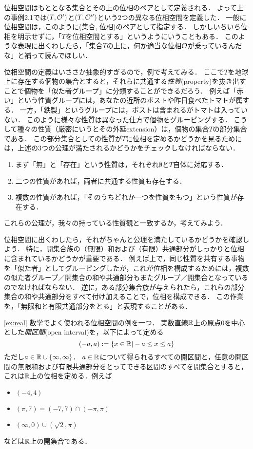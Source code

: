 \documentclass[11pt,a4paper]{jsarticle}
\begin{document}
位相空間はもととなる集合とその上の位相のペアとして定義される．
よって上の事例2.1では$(T, \mathcal{O}')$と$(T, \mathcal{O}'')$という2つの異なる位相空間を定義した．
一般に位相空間は，このように(集合, 位相)のペアとして指定する．
しかしいちいち位相を明示せずに，「$T$を位相空間とする」というようにいうこともある．
このような表現に出くわしたら，「集合$T$の上に，何か適当な位相$\mathcal{O}$が乗っているんだな」と補って読んでほしい．


\begin{example}
位相空間の定義はいささか抽象的すぎるので，例で考えてみる．
ここで$T$を地球上に存在する個物の集合とすると，それらに共通する\emph{性質}(property)を抜き出すことで個物を「似た者グループ」に分類することができるだろう．
例えば「赤い」という性質グループには，あなたの近所のポストや昨日食べたトマトが属する．
一方，「鉄製」というグループには，ポストは含まれるがトマトは入っていない．
このように様々な性質は異なった仕方で個物をグルーピングする．
こうして種々の性質（厳密にいうとその外延extension）は，個物の集合$T$の部分集合である．
この部分集合としての性質が$T$に位相を定めるかどうかを見るためには，上述の3つの公理が満たされるかどうかをチェックしなければならない．
\begin{enumerate}
 \item まず「無」と「存在」という性質は，それぞれ$\emptyset$と$T$自体に対応する．
 \item 二つの性質があれば，両者に共通する性質も存在する．
 \item 複数の性質があれば，「そのうちどれか一つを性質をもつ」という性質が存在する．
\end{enumerate}
これらの公理が，我々の持っている性質観と一致するか，考えてみよう．
\end{example}


位相空間に出くわしたら，それがちゃんと公理を満たしているかどうかを確認しよう．
特に，開集合族の（無限）和および（有限）共通部分がしっかりと位相に含まれているかどうかが重要である．
例えば上で，同じ性質を共有する事物を「似た者」としてグルーピングしたが，これが位相を構成するためには，複数の似た者グループ／開集合の和や共通部分もまたグループ／開集合となっているのでなければならない．
逆に，ある部分集合族が与えられたら，これらの部分集合の和や共通部分をすべて付け加えることで，位相を構成できる．
この作業を，「無限和と有限共通部分をとる」と表現することがある．


\begin{example}
\ref{ex:real}
数学でよく使われる位相空間の例を一つ．
実数直線$\mathbb{R}$上の原点0を中心とした\emph{開区間}(open interval)を，以下によって定める
\[
  (-a, a) := \{ x \in \mathbb{R}| -a \leq x \leq a \}
\]
ただし$a \in \mathbb{R} \cup \{\infty, \infty\}$．
$a \in \mathbb{R}$について得られるすべての開区間と，任意の開区間の無限和および有限共通部分をとってできる区間のすべてを開集合とすると，これは$\mathbb{R}$上の位相を定める．例えば
\begin{itemize}
 \item $(-4,4)$
 \item $(\pi,7) = (-7,7) \cap (-\pi, \pi)$ 
 \item $(\infty, 0) \cup (\sqrt{2}, \pi)$
\end{itemize}
などは$\mathbb{R}$上の開集合である．
\end{example}
\end{document}
